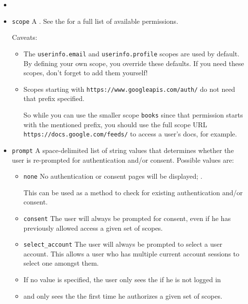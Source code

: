 \begin{itemize}
\item
\item \verb|scope| A . 
See the 
 for a full
list of available permissions. 

Caveats:
\begin{itemize}
\item
The \verb|userinfo.email| and \verb|userinfo.profile| 
scopes are used by default. By
defining your own scope, you override these defaults. If you need these
scopes, don't forget to add them yourself!
\item
Scopes starting with \verb|https://www.googleapis.com/auth/| 
do not need that
prefix specified. 

So while you can use the smaller scope \verb|books| since that
permission starts with the mentioned prefix, you should use the full scope
URL \verb|https://docs.google.com/feeds/| 
to access a user's docs, for example.
\end{itemize}
\item \verb|prompt| A space-delimited list of string values that
determines whether the user is re-prompted for authentication and/or
consent. Possible values are:

\begin{itemize}
\item \verb|none| No authentication or consent pages will be displayed;
. 

This can be
used as a method to check for existing authentication and/or consent.
\item \verb|consent| The user will always be prompted for consent,
even if he has previously allowed access a given set of scopes.
\item \verb|select_account| The user will always be prompted to select
a user account. This allows a user who has multiple current account
sessions to select one amongst them.
\end{itemize}

\begin{itemize}
\item
If no value is specified, the user only sees the 
if he is not logged in 
\item
and only sees the  the first time he
authorizes a given set of scopes.
\end{itemize}


\end{itemize}
